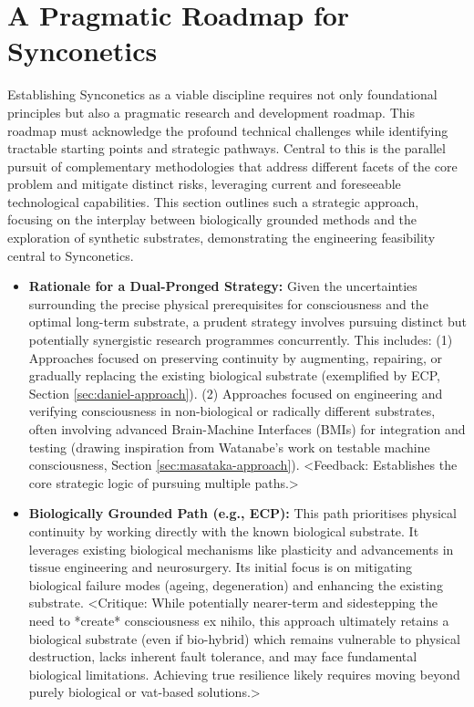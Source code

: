 \documentclass[10pt]{article}
\begin{document}
\begin{sloppypar}

  \section{A Pragmatic Roadmap for Synconetics}
  \label{sec:roadmap}

  Establishing Synconetics as a viable discipline requires not only foundational principles but also a pragmatic research and development roadmap. This roadmap must acknowledge the profound technical challenges while identifying tractable starting points and strategic pathways. Central to this is the parallel pursuit of complementary methodologies that address different facets of the core problem and mitigate distinct risks, leveraging current and foreseeable technological capabilities. This section outlines such a strategic approach, focusing on the interplay between biologically grounded methods and the exploration of synthetic substrates, demonstrating the engineering feasibility central to Synconetics.

  \begin{itemize}
    \item \textbf{Rationale for a Dual-Pronged Strategy:} Given the uncertainties surrounding the precise physical prerequisites for consciousness and the optimal long-term substrate, a prudent strategy involves pursuing distinct but potentially synergistic research programmes concurrently. This includes: (1) Approaches focused on preserving continuity by augmenting, repairing, or gradually replacing the existing biological substrate (exemplified by ECP, Section \ref{sec:daniel-approach}). (2) Approaches focused on engineering and verifying consciousness in non-biological or radically different substrates, often involving advanced Brain-Machine Interfaces (BMIs) for integration and testing (drawing inspiration from Watanabe's work on testable machine consciousness, Section \ref{sec:masataka-approach}). <Feedback: Establishes the core strategic logic of pursuing multiple paths.>

    \item \textbf{Biologically Grounded Path (e.g., ECP):} This path prioritises physical continuity by working directly with the known biological substrate. It leverages existing biological mechanisms like plasticity and advancements in tissue engineering and neurosurgery. Its initial focus is on mitigating biological failure modes (ageing, degeneration) and enhancing the existing substrate. <Critique: While potentially nearer-term and sidestepping the need to *create* consciousness ex nihilo, this approach ultimately retains a biological substrate (even if bio-hybrid) which remains vulnerable to physical destruction, lacks inherent fault tolerance, and may face fundamental biological limitations. Achieving true resilience likely requires moving beyond purely biological or vat-based solutions.>


\end{itemize}
\end{sloppypar}
\end{document}
